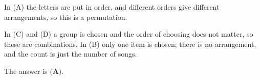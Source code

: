 In (A) the letters are put in order, and different orders give different arrangements, so this is a permutation.

In (C) and (D) a group is chosen and the order of choosing does not matter, so these are combinations. In (B) only one item is chosen; there is no arrangement, and the count is just the number of songs.

The answer is $\boxed{\textbf{(A)}}$.
